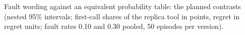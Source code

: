 \begin{table}[!htbp]
\centering
\caption{Fault wording against an equivalent probability table: the planned contrasts (nested 95\% intervals; first-call shares of the replica tool in points, regret in regret units; fault rates 0.10 and 0.30 pooled, 50 episodes per version).}
\label{tab:t-contrasts}
\scriptsize\setlength{\tabcolsep}{3pt}
\resizebox{\linewidth}{!}{}
\end{table}
